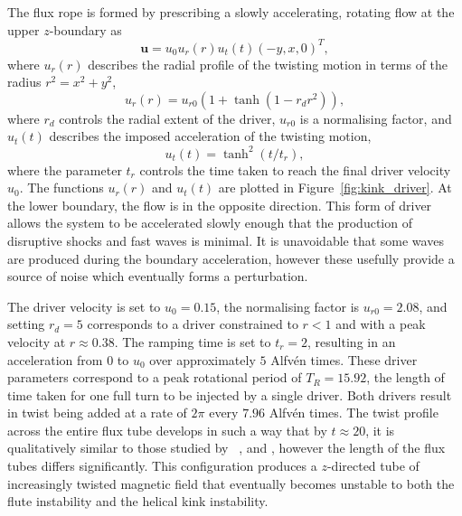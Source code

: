 \documentclass[fleqn,usenatbib]{mnras}
\newcommand{\revcite}[1]{{\color{red} \underline{#1}}}
\renewcommand{\vec}[1]{{\bm #1}}
\begin{document}
The flux rope is formed by prescribing a slowly accelerating, rotating flow at
the upper $z$-boundary as
\begin{equation}
  \label{eq:null_twisting_profile}
  \vec{u} = u_0 u_r(r) u_t(t) (-y, x, 0)^T,
\end{equation}
where $u_r(r)$ describes the radial profile of the twisting motion in terms of
the radius $r^2 = x^2 + y^2$,
\begin{equation}
  \label{eq:radial_twisting_function}
  u_r(r) = u_{r0}(1 + \tanh(1 - r_d r^2)),
\end{equation}
where $r_d$ controls the radial extent of the driver, $u_{r0}$ is a normalising
factor, and $u_t(t)$ describes the imposed acceleration of the twisting motion,
\begin{equation}
  \label{eq:ramping_up_function}
  u_t(t) = \tanh^2(t/t_r),
\end{equation}
where the parameter $t_r$ controls the time taken to reach the final driver
velocity $u_0$. The functions $u_r(r)$ and $u_t(t)$ are plotted in
Figure~\ref{fig:kink_driver}. At the lower boundary, the flow is in the
opposite direction. This form of driver allows the system to be accelerated
slowly enough that the production of disruptive shocks and fast waves is
minimal. It is unavoidable that some waves are produced during the boundary
acceleration, however these usefully provide a source of noise which eventually
forms a perturbation.

The driver velocity is set to $u_0 = 0.15$, the normalising factor is $u_{r0}
= 2.08$, and setting $r_d = 5$ corresponds to a driver constrained to $r<1$ and
with a peak velocity at $r\approx 0.38$. The ramping time is set to $t_r = 2$,
resulting in an acceleration from $0$ to $u_0$ over approximately $5$ Alfv\'en
times. These driver parameters correspond to a peak rotational period of $T_R
= 15.92$, the length of time taken for one full turn to be injected by a single
driver. Both drivers result in twist being added at a rate of $2\pi$ every
$7.96$ Alfv\'en times. The twist profile across the entire flux tube develops
in such a way that by $t\approx 20$, it is qualitatively similar to those
studied
by~\revcite{\citet{quinnEffectAnisotropicViscosity2020,hoodCoronalHeatingMagnetic2009}}, and \revcite{\citet{barefordShockHeatingNumerical2015}},
however the length of the flux tubes differs significantly. This configuration
produces a $z$-directed tube of increasingly twisted magnetic field that
eventually becomes unstable to both the flute instability and the helical kink
instability.
\end{document}
